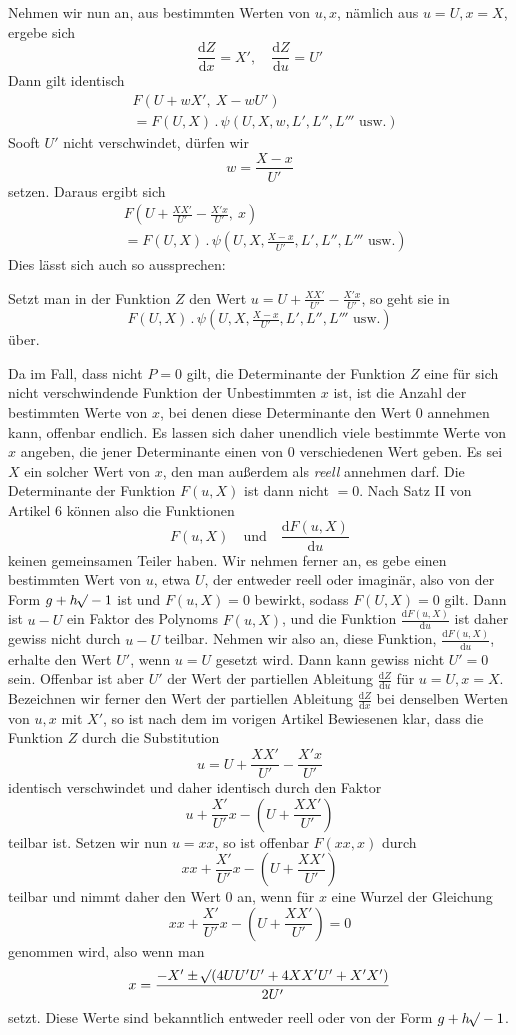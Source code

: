 Nehmen wir nun an, aus bestimmten Werten von $u,x$, nämlich aus $u=U,x=X$, ergebe sich
\[
\frac{\mathrm dZ}{\mathrm dx}=X',\quad\frac{\mathrm dZ}{\mathrm du}=U'
\]
Dann gilt identisch
\[
\begin{aligned}
&F(U+wX',\ X-wU')\\
&=F(U,X)\, .\,\psi(U,X,w,L',L'',L'''\text{ usw.})
\end{aligned}
\]
Sooft $U'$ nicht verschwindet, dürfen wir
\[
w=\frac{X-x}{U'}
\]
setzen. Daraus ergibt sich
\[
\begin{aligned}
&F(U+\tfrac{XX'}{U'}-\tfrac{X'x}{U'},\ x)\\
&=F(U,X)\, .\,\psi(U,X,\tfrac{X-x}{U'},L',L'',L'''\text{ usw.})
\end{aligned}
\]
Dies lässt sich auch so aussprechen:

Setzt man in der Funktion $Z$ den Wert $u=U+\frac{XX'}{U'}-\frac{X'x}{U'}$, so geht sie in
\[
F(U,X)\, .\,\psi(U,X,\tfrac{X-x}{U'},L',L'',L'''\text{ usw.})
\]
über.

Da im Fall, dass nicht $P=0$ gilt, die Determinante der Funktion $Z$ eine für sich nicht verschwindende Funktion der Unbestimmten $x$ ist, ist die Anzahl der bestimmten Werte von $x$, bei denen diese Determinante den Wert 0 annehmen kann, offenbar endlich. Es lassen sich daher unendlich viele bestimmte Werte von $x$ angeben, die jener Determinante einen von 0 verschiedenen Wert geben. Es sei $X$ ein solcher Wert von $x$, den man außerdem als \textit{reell} annehmen darf. Die Determinante der Funktion $F(u,X)$ ist dann nicht $=0$. Nach Satz II von Artikel 6 können also die Funktionen
\[
F(u,X)\quad\text{und}\quad\frac{\mathrm dF(u,X)}{\mathrm du}
\]
keinen gemeinsamen Teiler haben. Wir nehmen ferner an, es gebe einen bestimmten Wert von $u$, etwa $U$, der entweder reell oder imaginär, also von der Form $g+h\mathord{{}^{}\!\surd}-1$ ist und $F(u,X)=0$ bewirkt, sodass $F(U,X)=0$ gilt. Dann ist $u-U$ ein Faktor des Polynoms $F(u,X)$, und die Funktion $\frac{\mathrm dF(u,X)}{\mathrm du}$ ist daher gewiss nicht durch $u-U$ teilbar. Nehmen wir also an, diese Funktion,
$\frac{\mathrm dF(u,X)}{\mathrm du}$, erhalte den Wert $U'$, wenn $u=U$ gesetzt wird. Dann kann gewiss nicht $U'=0$ sein. Offenbar ist aber $U'$ der Wert der partiellen Ableitung $\frac{\mathrm dZ}{\mathrm du}$ für $u=U,x=X$. Bezeichnen wir ferner den Wert der partiellen Ableitung $\frac{\mathrm dZ}{\mathrm dx}$ bei denselben Werten von $u,x$ mit $X'$, so ist nach dem im vorigen Artikel Bewiesenen klar, dass die Funktion $Z$ durch die Substitution
\[
u=U+\frac{XX'}{U'}-\frac{X'x}{U'}
\]
identisch verschwindet und daher identisch durch den Faktor
\[
u+\frac{X'}{U'}x-(U+\frac{XX'}{U'})
\]
teilbar ist. Setzen wir nun $u=xx$, so ist offenbar $F(xx,x)$ durch
\[
xx+\frac{X'}{U'}x-(U+\frac{XX'}{U'})
\]
teilbar und nimmt daher den Wert 0 an, wenn für $x$ eine Wurzel der Gleichung
\[
xx+\frac{X'}{U'}x-(U+\frac{XX'}{U'})=0
\]
genommen wird, also wenn man
\[
x=\frac{-X'\pm\mathord{{}^{}\!\surd}(4UU'U'+4XX'U'+X'X')}{2U'}
\]
setzt. Diese Werte sind bekanntlich entweder reell oder von der Form \mbox{$g+h\mathord{{}^{}\!\surd}-1$}.


